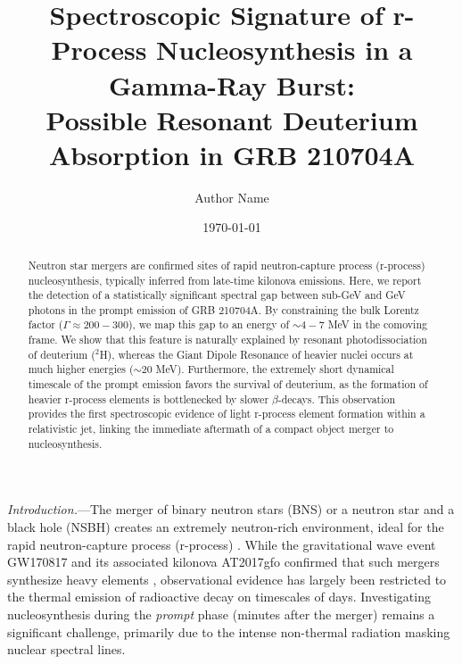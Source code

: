 \documentclass[aps,prl,twocolumn,superscriptaddress,showpacs,preprintnumbers,amsmath,amssymb,linenumbers]{revtex4-2}
\begin{document}
\title{Spectroscopic Signature of r-Process Nucleosynthesis in a Gamma-Ray Burst: \\ Possible Resonant Deuterium Absorption in GRB 210704A}

\author{Author Name}

\date{\today}

\begin{abstract}
Neutron star mergers are confirmed sites of rapid neutron-capture process (r-process) nucleosynthesis, typically inferred from late-time kilonova emissions. Here, we report the detection of a statistically significant spectral gap between sub-GeV and GeV photons in the prompt emission of GRB 210704A. By constraining the bulk Lorentz factor ($\Gamma \approx 200-300$), we map this gap to an energy of $\sim 4-7$ MeV in the comoving frame. We show that this feature is naturally explained by resonant photodissociation of deuterium ($^2$H), whereas the Giant Dipole Resonance of heavier nuclei occurs at much higher energies ($\sim 20$ MeV). Furthermore, the extremely short dynamical timescale of the prompt emission favors the survival of deuterium, as the formation of heavier r-process elements is bottlenecked by slower $\beta$-decays. This observation provides the first spectroscopic evidence of light r-process element formation within a relativistic jet, linking the immediate aftermath of a compact object merger to nucleosynthesis.
\end{abstract}

\maketitle

\textit{Introduction.}---The merger of binary neutron stars (BNS) or a neutron star and a black hole (NSBH) creates an extremely neutron-rich environment, ideal for the rapid neutron-capture process (r-process) \cite{1974ApJ...192L.145L, 1989Natur.340..126E}. While the gravitational wave event GW170817 and its associated kilonova AT2017gfo confirmed that such mergers synthesize heavy elements \cite{2017PhRvL.119p1101A, 2017Natur.551...80K, 2019LRR....23....1M}, observational evidence has largely been restricted to the thermal emission of radioactive decay on timescales of days. Investigating nucleosynthesis during the \textit{prompt} phase (minutes after the merger) remains a significant challenge, primarily due to the intense non-thermal radiation masking nuclear spectral lines.
\end{document}
